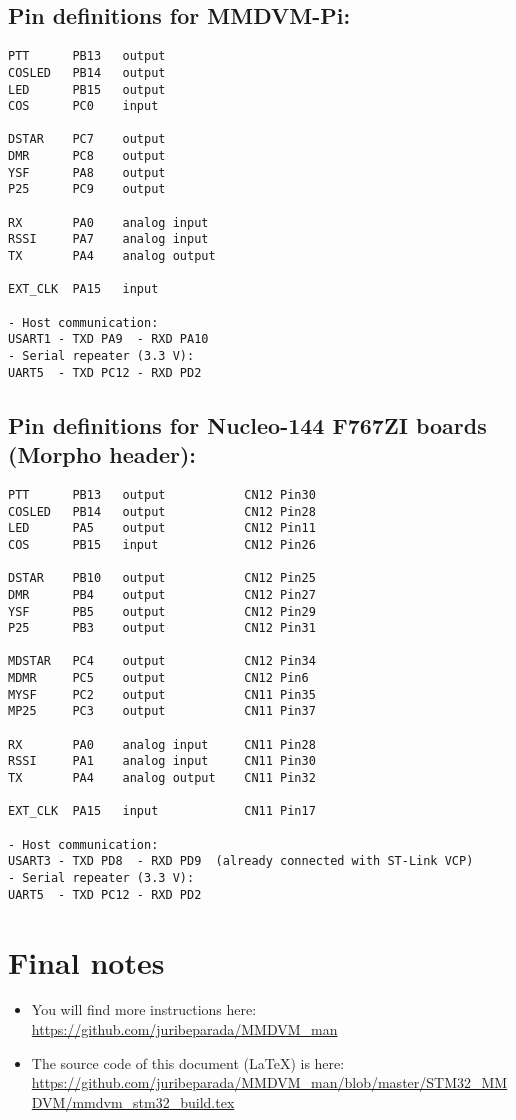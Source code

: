 \documentclass[]{article}
\begin{document}
\subsection{Pin definitions for MMDVM-Pi:}

\begin{verbatim}
PTT      PB13   output
COSLED   PB14   output
LED      PB15   output
COS      PC0    input

DSTAR    PC7    output
DMR      PC8    output
YSF      PA8    output
P25      PC9    output

RX       PA0    analog input
RSSI     PA7    analog input
TX       PA4    analog output

EXT_CLK  PA15   input

- Host communication:
USART1 - TXD PA9  - RXD PA10
- Serial repeater (3.3 V):
UART5  - TXD PC12 - RXD PD2
\end{verbatim}

\subsection{Pin definitions for Nucleo-144 F767ZI boards (Morpho header):}

\begin{verbatim}
PTT      PB13   output           CN12 Pin30
COSLED   PB14   output           CN12 Pin28
LED      PA5    output           CN12 Pin11
COS      PB15   input            CN12 Pin26

DSTAR    PB10   output           CN12 Pin25
DMR      PB4    output           CN12 Pin27
YSF      PB5    output           CN12 Pin29
P25      PB3    output           CN12 Pin31

MDSTAR   PC4    output           CN12 Pin34
MDMR     PC5    output           CN12 Pin6
MYSF     PC2    output           CN11 Pin35
MP25     PC3    output           CN11 Pin37

RX       PA0    analog input     CN11 Pin28
RSSI     PA1    analog input     CN11 Pin30
TX       PA4    analog output    CN11 Pin32

EXT_CLK  PA15   input            CN11 Pin17

- Host communication:
USART3 - TXD PD8  - RXD PD9  (already connected with ST-Link VCP)
- Serial repeater (3.3 V):
UART5  - TXD PC12 - RXD PD2
\end{verbatim}

\section{Final notes}

\begin{itemize}[leftmargin=*]
	
\item You will find more instructions here: \url{https://github.com/juribeparada/MMDVM_man}

\item The source code of this document (LaTeX) is here: \url{https://github.com/juribeparada/MMDVM_man/blob/master/STM32_MMDVM/mmdvm_stm32_build.tex}

\end{itemize}
\end{document}
